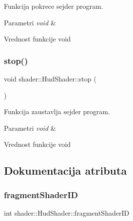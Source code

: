 Funkcija pokrece sejder program. 


\begin{DoxyParams}{Parametri}
{\em void} & \\
\hline
\end{DoxyParams}
\begin{DoxyReturn}{Vrednost funkcije}
void 
\end{DoxyReturn}
\mbox{\label{classshader_1_1HudShader_ac6abdbd414b55257314aeddf68e54384}} 
\subsubsection{\texorpdfstring{stop()}{stop()}}
{\footnotesize\ttfamily void shader\+::\+Hud\+Shader\+::stop (\begin{DoxyParamCaption}\item[{void}]{ }\end{DoxyParamCaption})}



Funkcija zaustavlja sejder program. 


\begin{DoxyParams}{Parametri}
{\em void} & \\
\hline
\end{DoxyParams}
\begin{DoxyReturn}{Vrednost funkcije}
void 
\end{DoxyReturn}


\subsection{Dokumentacija atributa}
\mbox{\label{classshader_1_1HudShader_a2fec1c7c6e31bbb086e937838443b021}} 
\subsubsection{\texorpdfstring{fragment\+Shader\+ID}{fragmentShaderID}}
{\footnotesize\ttfamily int shader\+::\+Hud\+Shader\+::fragment\+Shader\+ID\hspace{0.3cm}{\ttfamily [private]}}



